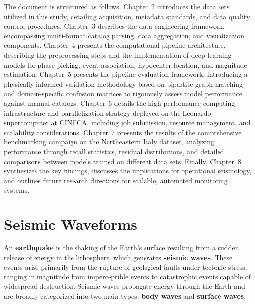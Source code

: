 The document is structured as follows. Chapter~2 introduces the data sets
utilized in this study, detailing acquisition, metadata standards, and data
quality control procedures. Chapter~3 describes the data engineering
framework, encompassing multi-format catalog parsing, data aggregation, and
visualization components. Chapter~4 presents the computational pipeline
architecture, describing the preprocessing steps and the implementation of
deep-learning models for phase picking, event association, hypocenter
location, and magnitude estimation. Chapter~5 presents the pipeline evaluation
framework, introducing a physically informed validation methodology based on
bipartite graph matching and domain-specific confusion matrices to rigorously
assess model performance against manual catalogs. Chapter~6 details the
high-performance computing infrastructure and parallelization strategy deployed
on the Leonardo supercomputer at CINECA, including job submission, resource
management, and scalability considerations. Chapter~7 presents the results of
the comprehensive benchmarking campaign on the Northeastern Italy dataset,
analyzing performance through recall statistics, residual distributions, and
detailed comparisons between models trained on different data sets. Finally,
Chapter~8 synthesizes the key findings, discusses the implications for
operational seismology, and outlines future research directions for scalable,
automated monitoring systems.

\section{Seismic Waveforms}
An \textbf{earthquake} is the shaking of the Earth's surface resulting from a
sudden release of energy in the lithosphere, which generates
\textbf{seismic waves}. These events arise primarily from the rupture of
geological faults under tectonic stress, ranging in magnitude from
imperceptible events to catastrophic events capable of widespread destruction.
Seismic waves propagate energy through the Earth and are broadly categorized
into two main types: \textbf{body waves} and \textbf{surface waves}.

